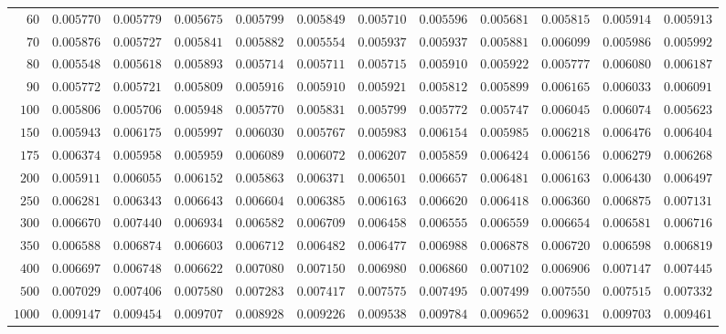 \begin{sidewaystable}
\begin{tabular}{r|rrrrrrrrrrr}
$60$ & $0.005770$ & $0.005779$ & $0.005675$ & $0.005799$ & $0.005849$ & $0.005710$ & $0.005596$ & $0.005681$ & $0.005815$ & $0.005914$ & $0.005913$ \\
$70$ & $0.005876$ & $0.005727$ & $0.005841$ & $0.005882$ & $0.005554$ & $0.005937$ & $0.005937$ & $0.005881$ & $0.006099$ & $0.005986$ & $0.005992$ \\
$80$ & $0.005548$ & $0.005618$ & $0.005893$ & $0.005714$ & $0.005711$ & $0.005715$ & $0.005910$ & $0.005922$ & $0.005777$ & $0.006080$ & $0.006187$ \\
$90$ & $0.005772$ & $0.005721$ & $0.005809$ & $0.005916$ & $0.005910$ & $0.005921$ & $0.005812$ & $0.005899$ & $0.006165$ & $0.006033$ & $0.006091$ \\
$100$ & $0.005806$ & $0.005706$ & $0.005948$ & $0.005770$ & $0.005831$ & $0.005799$ & $0.005772$ & $0.005747$ & $0.006045$ & $0.006074$ & $0.005623$ \\
$150$ & $0.005943$ & $0.006175$ & $0.005997$ & $0.006030$ & $0.005767$ & $0.005983$ & $0.006154$ & $0.005985$ & $0.006218$ & $0.006476$ & $0.006404$ \\
$175$ & $0.006374$ & $0.005958$ & $0.005959$ & $0.006089$ & $0.006072$ & $0.006207$ & $0.005859$ & $0.006424$ & $0.006156$ & $0.006279$ & $0.006268$ \\
$200$ & $0.005911$ & $0.006055$ & $0.006152$ & $0.005863$ & $0.006371$ & $0.006501$ & $0.006657$ & $0.006481$ & $0.006163$ & $0.006430$ & $0.006497$ \\
$250$ & $0.006281$ & $0.006343$ & $0.006643$ & $0.006604$ & $0.006385$ & $0.006163$ & $0.006620$ & $0.006418$ & $0.006360$ & $0.006875$ & $0.007131$ \\
$300$ & $0.006670$ & $0.007440$ & $0.006934$ & $0.006582$ & $0.006709$ & $0.006458$ & $0.006555$ & $0.006559$ & $0.006654$ & $0.006581$ & $0.006716$ \\
$350$ & $0.006588$ & $0.006874$ & $0.006603$ & $0.006712$ & $0.006482$ & $0.006477$ & $0.006988$ & $0.006878$ & $0.006720$ & $0.006598$ & $0.006819$ \\
$400$ & $0.006697$ & $0.006748$ & $0.006622$ & $0.007080$ & $0.007150$ & $0.006980$ & $0.006860$ & $0.007102$ & $0.006906$ & $0.007147$ & $0.007445$ \\
$500$ & $0.007029$ & $0.007406$ & $0.007580$ & $0.007283$ & $0.007417$ & $0.007575$ & $0.007495$ & $0.007499$ & $0.007550$ & $0.007515$ & $0.007332$ \\
$1000$ & $0.009147$ & $0.009454$ & $0.009707$ & $0.008928$ & $0.009226$ & $0.009538$ & $0.009784$ & $0.009652$ & $0.009631$ & $0.009703$ & $0.009461$ \\
\hline
\end{tabular}
\end{sidewaystable}
 

